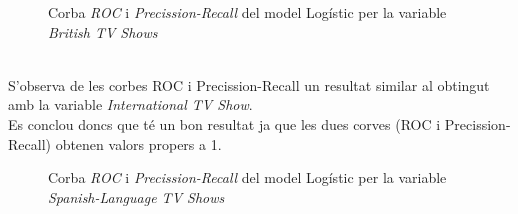 \documentclass[a4paper, 11pt]{article}
\begin{document}
\begin{figure}[h]
\centering
    \caption{Corba \textit{ROC} i \textit{Precission-Recall} del model Logístic per la variable \textit{British TV Shows}}
    \label{fig:my_label}
\end{figure}\\
\hspace{-1.5em}S'observa de les corbes ROC i Precission-Recall un resultat similar al obtingut amb la variable \textit{International TV Show}.\\
Es conclou doncs que té un bon resultat ja que les dues corves (ROC i Precission-Recall) obtenen valors propers a 1.
\begin{figure}[h]
\centering
    \caption{Corba \textit{ROC} i \textit{Precission-Recall} del model Logístic per la variable \textit{Spanish-Language TV Shows}}
    \label{fig:my_label}
\end{figure}\\
\end{document}
